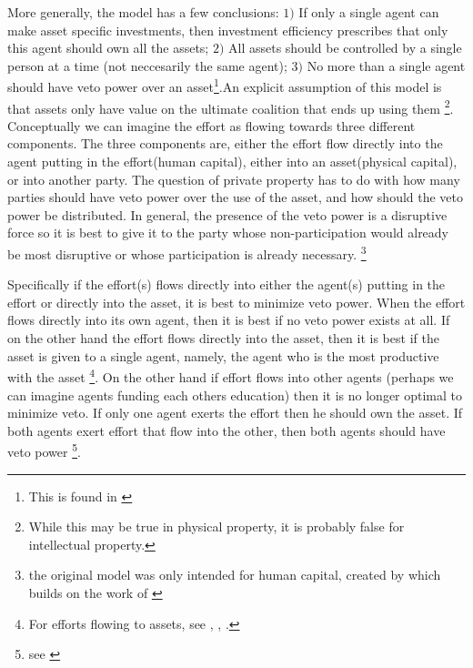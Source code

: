 \documentclass[12pt]{report}
\numberwithin{equation}{section}
\begin{document}
More generally, the model has a few conclusions: $1)$ If only a single agent can make asset specific investments, then investment efficiency prescribes that only this agent should own all the assets; $2)$ All assets should be controlled by a single person at a time (not neccesarily the same agent); $3)$ No more than a single agent should have veto power over an asset\footnote{This is found in \cite{Hart1990}}.An explicit assumption of this model is that assets only have value on the ultimate coalition that ends up using them \footnote{While this may be true in physical property, it is probably false for intellectual property.}. Conceptually we can imagine the effort as flowing towards three different components. The three components are, either the effort flow directly into the agent putting in the effort(human capital), either into an asset(physical capital), or into another party. The question of private property has to do with how many parties should have veto power over the use of the asset, and how should the veto power be distributed. In general, the presence of the veto power is a disruptive force so it is best to give it to the party whose non-participation would already be most disruptive or whose participation is already necessary. \footnote{the original model was only intended for human capital, created by \cite{Hart1990} which builds on the work of \cite{Grossman1986} }

Specifically if the effort(s) flows directly into either the agent(s) putting in the effort or directly into the asset, it is best to minimize veto power. When the effort flows directly into its  own agent, then it is best if no veto power exists at all. If on the other hand the effort flows directly into the asset, then it is best if the asset is given to a single agent, namely, the agent who is the most productive with the asset \footnote{For efforts flowing to assets, see \cite{schmitz2013investments}, \citet{gattai2016investment}, \cite{schmitz2017incomplete}. }. On the other hand if effort flows into other agents (perhaps we can imagine agents funding each others education) then it is no longer optimal to minimize veto. If only one agent exerts the effort then he should own the asset. If both agents exert effort that flow into the other, then both agents should have veto power \footnote{see \cite{hamada2011incentive}}.
\end{document}
